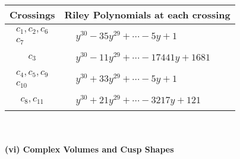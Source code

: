 \documentclass[1p]{elsarticle_modified}
\theoremstyle{definition}
\begin{document}
\begin{tabular}{m{50pt}|m{274pt}}
Crossings & \hspace{64pt}Riley Polynomials at each crossing \\
\hline $$\begin{aligned}c_{1},c_{2},c_{6}\\c_{7}\end{aligned}$$&$\begin{aligned}
&y^{30}-35 y^{29}+\cdots-5 y+1
\end{aligned}$\\
\hline $$\begin{aligned}c_{3}\end{aligned}$$&$\begin{aligned}
&y^{30}-11 y^{29}+\cdots-17441 y+1681
\end{aligned}$\\
\hline $$\begin{aligned}c_{4},c_{5},c_{9}\\c_{10}\end{aligned}$$&$\begin{aligned}
&y^{30}+33 y^{29}+\cdots-5 y+1
\end{aligned}$\\
\hline $$\begin{aligned}c_{8},c_{11}\end{aligned}$$&$\begin{aligned}
&y^{30}+21 y^{29}+\cdots-3217 y+121
\end{aligned}$\\
\hline
\end{tabular}\\~\\
\newpage\flushleft \textbf{(vi) Complex Volumes and Cusp Shapes}
\end{document}
